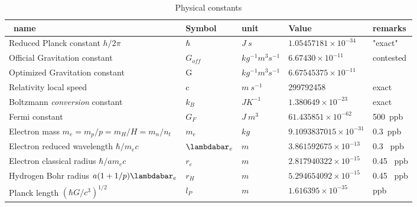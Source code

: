 \documentclass[a4paper,9pt]{article}
\newcounter{col}
\begin{document}
 
 \begin{table}
\caption[Table \ref{tab:3:table3}: Physical constants]{ Physical constants \cite{Zyla}}
\label{tab:3:table3}
  \hskip-2.0cm\begin{tabular}{lllll}
    \toprule
    \cmidrule(r){1-5}
    \ name & Symbol  & unit  & Value & remarks \\
    \midrule
  
 
 Reduced Planck constant $h/2\pi$    & $\hbar$   & $J ~s$   & $1.05457181 \times 10^{-34}$ & "exact" \\
 Official Gravitation constant   & $G_{off}$ & $kg^{-1} m^3 s^{-1}$ & $6.67430 \times 10^{-11}$  &  contested\\
 Optimized Gravitation constant   & G & $kg^{-1} m^3 s^{-1}$  & $6.67545375\times 10^{-11}$ &  \cite{Sanchez2}\\
 Relativity local speed     & c   & $m ~s^{-1}$   & 299792458 & exact \\
 
 Boltzmann \textit{conversion} constant    & $k_B$   & $J K^{-1}$   & $1.380649 \times 10^{-23} $ & exact \\
 

 
 
 
 Fermi constant  & $G_F$ & $J ~m^3$   & $61.435851 \times 10^{-62}$  &  500~ppb\\
 Electron mass $m_e = m_p/p = m_H/H = m_n/n_t$  & $m_e$ & $kg$  & $9.1093837015 \times 10^{-31}$  &  0.3~ppb\\
 Electron reduced wavelength $\hbar/m_ec$ & $\lambdabar_e$ &  $m$   & $3.861592675\times 10^{-13}$  & 0.3 ~ppb\\
 Electron classical radius $\hbar/am_ec$ & $r_e$ & $ m$   & $2.817940322\times 10^{-15}$  & 0.45 ~ppb\\
 Hydrogen Bohr radius $a(1+1/p)\lambdabar_e$ & $r_H$ & $ m $  & $5.294654092 \times 10^{-15}$  & 0.45 ~ppb\\
 Planck length $(\hbar G /c^3)^{1/2}$ & $l_P$  & $m$  & $1.616395 \times 10^{-35}$ & ppb \cite{Sanchez2}  \\
 

\end{tabular}
\end{table}
\end{document}
